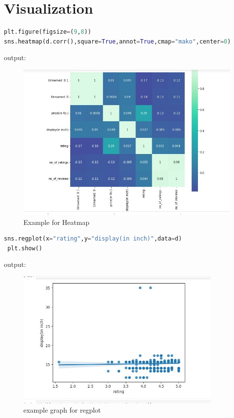 \section{Visualization} 
\begin{lstlisting}[language=Python]
plt.figure(figsize=(9,8))
sns.heatmap(d.corr(),square=True,annot=True,cmap="mako",center=0)
\end{lstlisting}
output:
\begin{figure}[h]
\centering
\footnotesize
\includegraphics[width=8in]{13.jpeg}
\caption{Example for Heatmap}
\label{fig:unevenlight}
\end{figure}

 \begin{lstlisting}[language=Python]
 sns.regplot(x="rating",y="display(in inch)",data=d)
 plt.show()
 \end{lstlisting}
 \vspace{4\baselineskip}
 output:
\begin{figure}[h]
\centering
\footnotesize
\includegraphics[width=4in]{15.png}
\caption{example graph for regplot}
\label{fig:unevenlight}
\end{figure}

